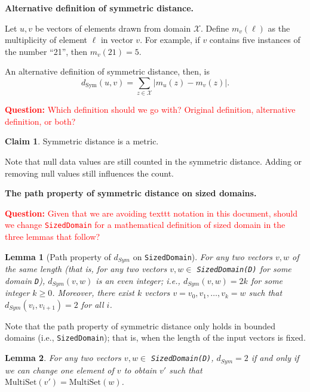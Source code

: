 \documentclass[11pt,a4paper]{article}
\newtheorem{lemma}{Lemma}
\theoremstyle{definition}
\newtheorem{claim}{Claim}
\newcommand{\MultiSet}{\mathrm{MultiSet}}
\newcommand{\questionc}[1]{\textcolor{red}{\textbf{Question:} #1}}
\newcommand{\grace}[1]{{ {\color{purple}{(grace)~#1}}}}
\begin{document}
\medskip
\textbf{Alternative definition of symmetric distance.}

Let $u,v$ be vectors of elements drawn from domain $\mathcal{X}$. Define $m_v(\ell)$ as the multiplicity of element $\ell$ in vector $v$. For example, if $v$ contains five instances of the number ``21'', then $m_v(21) = 5$.

An alternative definition of symmetric distance, then, is $$d_{\text{Sym}}(u,v) = \sum_{z\in \mathcal{X}} |m_u(z) - m_v(z)|.$$

\questionc{Which definition should we go with? Original definition, alternative definition, or both?}

\begin{claim}
Symmetric distance is a metric.
\end{claim}

Note that null data values are still counted in the symmetric distance. Adding or removing null values still influences the count.

\medskip
\textbf{The path property of symmetric distance on sized domains.}

\questionc{Given that we are avoiding texttt notation in this document, should we change \texttt{SizedDomain} for a mathematical definition of sized domain in the three lemmas that follow?}

\begin{lemma}[Path property of $d_{Sym}$ on \texttt{SizedDomain}]
    For any two vectors $v, w$ of the same length (that is, for any two vectors $v, w \in$ \texttt{SizedDomain(D)} for some domain \texttt{D}), $d_{Sym}(v,w)$ is an even integer; i.e., $d_{Sym}(v,w) = 2k$ for some integer $k \geq 0$. Moreover, there exist $k$ vectors $v=v_0, v_1, \ldots, v_k=w$ such that $d_{Sym}(v_i,v_{i+1})=2$ for all $i$.
\end{lemma}


Note that the path property of symmetric distance only holds in bounded domains (i.e., \texttt{SizedDomain}); that is, when the length of the input vectors is fixed.

\begin{lemma}
    For any two vectors $v, w \in$ \texttt{SizedDomain(D)}, $d_{Sym} = 2$ if and only if we can change one element of $v$ to obtain $v'$ such that $\MultiSet(v') = \MultiSet(w)$.
\end{lemma}
\end{document}
